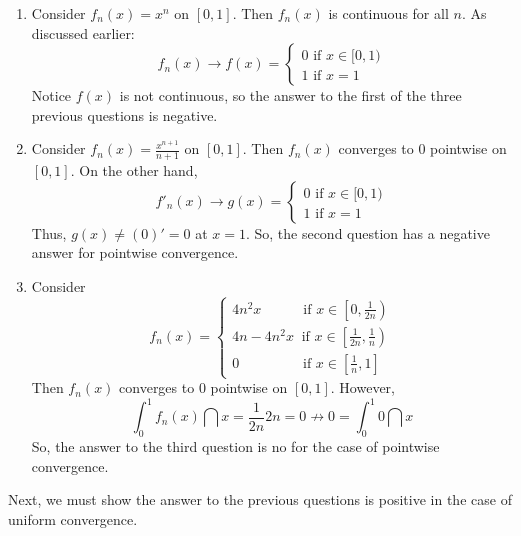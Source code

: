 \begin{eg}
    \begin{enumerate}
        \item Consider $f_n(x) = x^n$ on $[0,1]$. Then $f_n(x)$ is continuous for all $n$. As discussed earlier:
            \begin{equation*}
                f_n(x) \to f(x) = \begin{cases}
                    0 \text{ if } x \in [0,1) \\
                    1 \text{ if } x = 1
                \end{cases}
            \end{equation*}
        Notice $f(x)$ is not continuous, so the answer to the first of the three previous questions is negative.
        \item Consider $f_n(x) = \frac{x^{n+1}}{n+1}$ on $[0,1]$. Then $f_n(x)$ converges to $0$ pointwise on $[0,1]$. On the other hand,
            \begin{equation*}
                f'_n(x) \to g(x) = \begin{cases}
                    0 \text{ if } x \in [0,1) \\
                    1 \text{ if } x = 1
                \end{cases}
            \end{equation*}
            Thus, $g(x) \neq (0)' = 0$ at $x=1$. So, the second question has a negative answer for pointwise convergence.
        \item Consider
            \begin{equation*}
                f_n(x) = \begin{cases}
                    4n^2x \qquad \:\:\: \text{ if } x \in \left [ 0, \frac{1}{2n} \right ) \\
                    4n - 4n^2x \ \text{ if } x \in \left [\frac{1}{2n}, \frac{1}{n} \right ) \\
                    0 \qquad \qquad \: \text{ if } x \in \left [ \frac{1}{n}, 1 \right ]
                \end{cases}
            \end{equation*}
            Then $f_n(x)$ converges to $0$ pointwise on $[0,1]$. However,
            \begin{equation*}
                \int_0^1 f_n(x) \dint x = \frac{1}{2n}2n = 0 \not \to 0 = \int_0^1 0 \dint x
            \end{equation*}
            So, the answer to the third question is no for the case of pointwise convergence.
    \end{enumerate}
\end{eg}
\vspace{1em}
Next, we must show the answer to the previous questions is positive in the case of uniform convergence.

